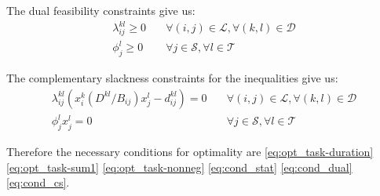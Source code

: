 The dual feasibility constraints give us:
\begin{subequations}\label{eq:cond_dual}
	\begin{align}
		\lambda_{ij}^{kl} \geq 0 & \quad \forall(i,j)\in\mathcal{L}, \forall(k,l)\in\mathcal{D} \label{eq:cond_dual_lambda} \\
		\phi_j^l \geq 0 & \quad \forall j\in\mathcal{S},\forall l\in\mathcal{T} \label{eq:cond_dual_phi}
	\end{align}
\end{subequations}

The complementary slackness constraints for the inequalities give us:
\begin{subequations}\label{eq:cond_cs}
	\begin{align}
		\lambda_{ij}^{kl}\left(x_i^k(D^{kl}/B_{ij})x_j^l - d_{ij}^{kl}\right) = 0 & \quad \forall(i,j)\in\mathcal{L}, \forall(k,l)\in\mathcal{D} \label{eq:cond_cs_duration} \\
		\phi_j^lx_j^l = 0 & \quad \forall j\in\mathcal{S},\forall l\in\mathcal{T} \label{eq:cond_cs_nonneg}
	\end{align}
\end{subequations}

Therefore the necessary conditions for optimality are \eqref{eq:opt_task-duration} \eqref{eq:opt_task-sum1} \eqref{eq:opt_task-nonneg} \eqref{eq:cond_stat} \eqref{eq:cond_dual} \eqref{eq:cond_cs}.

